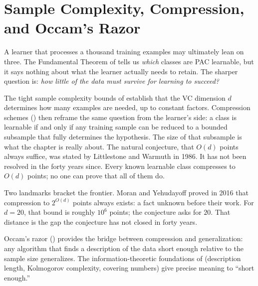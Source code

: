 %

\chapter{Sample Complexity, Compression, and Occam's Razor}
\label{ch:compression}

A learner that processes a thousand training examples may ultimately lean on
three.  The Fundamental Theorem of  tells us \emph{which} classes
are PAC learnable, but it says nothing about what the learner actually needs to
retain.  The sharper question is: \emph{how little of the data must survive
for learning to succeed?}

The tight sample complexity bounds of  establish that
the VC dimension $d$ determines how many examples are needed, up to constant
factors.  Compression schemes () then reframe the same
question from the learner's side: a class is learnable if and only if any
training sample can be reduced to a bounded subsample that fully determines the
hypothesis.  The size of that subsample is what the chapter is really about.
The natural conjecture, that $O(d)$ points always suffice, was stated by
Littlestone and Warmuth in 1986.  It has not been resolved in the forty years
since.  Every known learnable class compresses to $O(d)$ points; no one can
prove that all of them do.

Two landmarks bracket the frontier.  Moran and Yehudayoff proved in 2016 that
compression to $2^{O(d)}$ points always exists: a fact unknown before their
work.  For $d = 20$, that bound is roughly $10^6$ points; the conjecture asks
for $20$.  That distance is the gap the conjecture has not closed in forty years.

Occam's razor () provides the bridge between compression and
generalization: any algorithm that finds a description of the data short enough
relative to the sample size generalizes.  The information-theoretic foundations
of  (description length, Kolmogorov complexity,
covering numbers) give precise meaning to ``short enough.''

